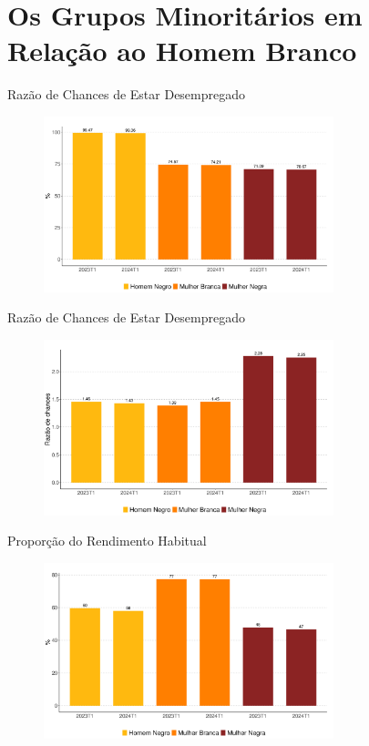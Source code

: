 \documentclass[10pt, xcolor=x11names,compress]{beamer}
\begin{document}
	
	\section{Os Grupos Minoritários em Relação ao Homem Branco} 
	\begin{frame}{Razão de Chances de Estar Desempregado}
		\begin{figure}
			\centering
			\includegraphics[width = 0.75\textwidth]{../figures_output/frac_pea.pdf}
		\end{figure}
	\end{frame}
	
	\begin{frame}{Razão de Chances de Estar Desempregado}
		\begin{figure}
			\centering
			\includegraphics[width = 0.75\textwidth]{../figures_output/frac_unemp.pdf}
		\end{figure}
	\end{frame}
	
	\begin{frame}{Proporção do Rendimento Habitual}
		\begin{figure}
			\centering
			\includegraphics[width = 0.75\textwidth]{../figures_output/frac_rendimento_habitual.pdf}
		\end{figure}
	\end{frame}
	
\end{document}
